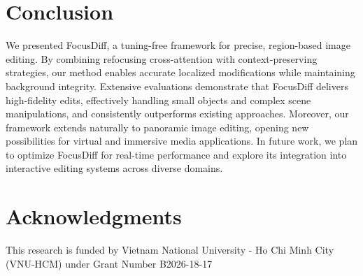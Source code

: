 \documentclass[runningheads]{llncs}
\begin{document}
\section{Conclusion}
We presented FocusDiff, a tuning-free framework for precise, region-based image editing. By combining refocusing cross-attention with context-preserving strategies, our method enables accurate localized modifications while maintaining background integrity. Extensive evaluations demonstrate that FocusDiff delivers high-fidelity edits, effectively handling small objects and complex scene manipulations, and consistently outperforms existing approaches. Moreover, our framework extends naturally to panoramic image editing, opening new possibilities for virtual and immersive media applications. In future work, we plan to optimize FocusDiff for real-time performance and explore its integration into interactive editing systems across diverse domains.


\section*{Acknowledgments}

This research is funded by Vietnam National University - Ho Chi Minh City (VNU-HCM) under Grant Number B2026-18-17



\end{document}
